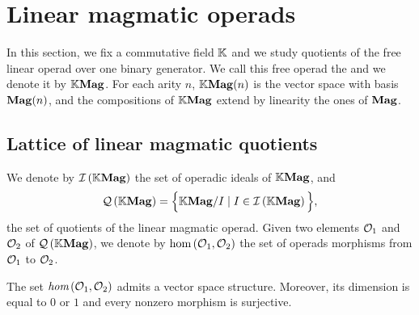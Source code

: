 
\section{Linear magmatic operads}
\label{sec:Magmatic_operads}

In this section, we fix a commutative field $\mathbb{K}$ and we study quotients
of the free linear operad over one binary generator. We call this free
operad the  and we denote it by $\mathbb{K}\mathbf{Mag}$. For
each arity $n$, $\mathbb{K}\mathbf{Mag}(n)$ is the vector space with basis $\mathbf{Mag}(n)$, and
the compositions of $\mathbb{K}\mathbf{Mag}$ extend by linearity the ones of $\mathbf{Mag}$.

\subsection{Lattice of linear magmatic quotients}

We denote by $\mathcal{I}\left(\mathbb{K}\mathbf{Mag}\right)$ the set of operadic ideals of $\mathbb{K}\mathbf{Mag}$, and
\begin{equation} \label{equ:definition_of_QMag}
  \mathcal{Q}\left(\mathbb{K}\mathbf{Mag}\right) =\Big\{\mathbb{K}\mathbf{Mag}/ I\mid I\in\mathcal{I}\left(\mathbb{K}\mathbf{Mag}\right)\Big\},
  \end{equation}
the set of quotients of the linear magmatic operad. Given two elements
$\mathcal{O}_1$ and $\mathcal{O}_2$ of $\mathcal{Q}\left(\mathbb{K}\mathbf{Mag}\right)$, we denote by
$\text{hom}\left(\mathcal{O}_1,\mathcal{O}_2\right)$ the set of operads morphisms from
$\mathcal{O}_1$ to $\mathcal{O}_2$.

\begin{Proposition} \label{prop:endomorphisms_of_magmatic_operads}
  The set $\emph{hom}\left(\mathcal{O}_1,\mathcal{O}_2\right)$ admits a vector space
  structure. Moreover, its dimension is equal to $0$ or $1$ and every
  nonzero morphism is surjective.
\end{Proposition}

